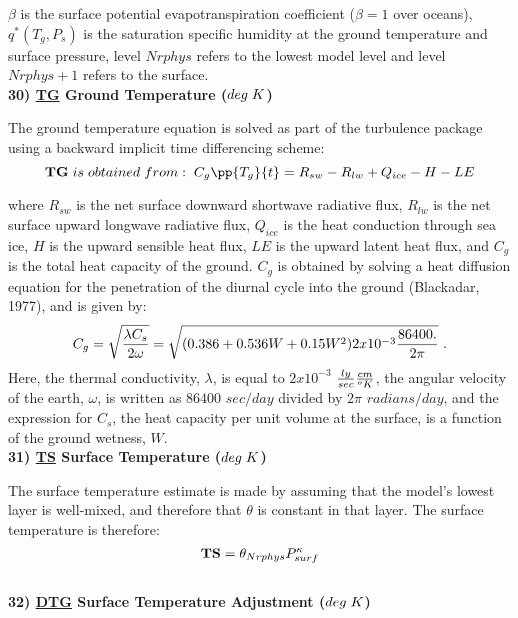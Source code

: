 \noindent
$\beta$ is the surface potential evapotranspiration coefficient ($\beta=1$ over oceans),
$q^*(T_g,P_s)$ is the saturation specific humidity at the ground temperature 
and surface pressure, level $Nrphys$ refers to the lowest model level and level $Nrphys+1$ 
refers to the surface.
\\

 
\noindent
{\bf 30)  \underline {TG}  Ground Temperature ($deg \hspace{.1cm} K$) }

\noindent
The ground temperature equation is solved as part of the turbulence package
using a backward implicit time differencing scheme:
\[
{\bf TG} \hspace{.1cm} is \hspace{.1cm} obtained \hspace{.1cm} from: \hspace{.1cm}
C_g\pp{T_g}{t} = R_{sw} - R_{lw} + Q_{ice} - H - LE
\]

\noindent
where $R_{sw}$ is the net surface downward shortwave radiative flux, $R_{lw}$ is the
net surface upward longwave radiative flux, $Q_{ice}$ is the heat conduction through
sea ice, $H$ is the upward sensible heat flux, $LE$ is the upward latent heat
flux, and $C_g$ is the total heat capacity of the ground. 
$C_g$ is obtained by solving a heat diffusion equation 
for the penetration of the diurnal cycle into the ground (Blackadar, 1977), and is given by:
\[
C_g = \sqrt{ {\lambda C_s \over {2 \omega} } } = \sqrt{(0.386 + 0.536W + 0.15W^2)2x10^{-3}
{ 86400. \over {2 \pi} } } \, \, .
\]
\noindent
Here, the thermal conductivity, $\lambda$, is equal to $2x10^{-3}$ ${ly\over{ sec}} 
{cm \over {^oK}}$, 
the angular velocity of the earth, $\omega$, is written as $86400$ $sec/day$ divided 
by $2 \pi$ $radians/
day$, and the expression for $C_s$, the heat capacity per unit volume at the surface, 
is a function of the ground wetness, $W$. 
\\

\noindent
{\bf 31)  \underline {TS}  Surface Temperature ($deg \hspace{.1cm} K$) }

\noindent
The surface temperature estimate is made by assuming that the model's lowest
layer is well-mixed, and therefore that $\theta$ is constant in that layer.
The surface temperature is therefore:
\[
{\bf TS} = \theta_{Nrphys} P^{\kappa}_{surf}
\]
\\
 
\noindent
{\bf 32)  \underline {DTG}  Surface Temperature Adjustment ($deg \hspace{.1cm} K$) }

